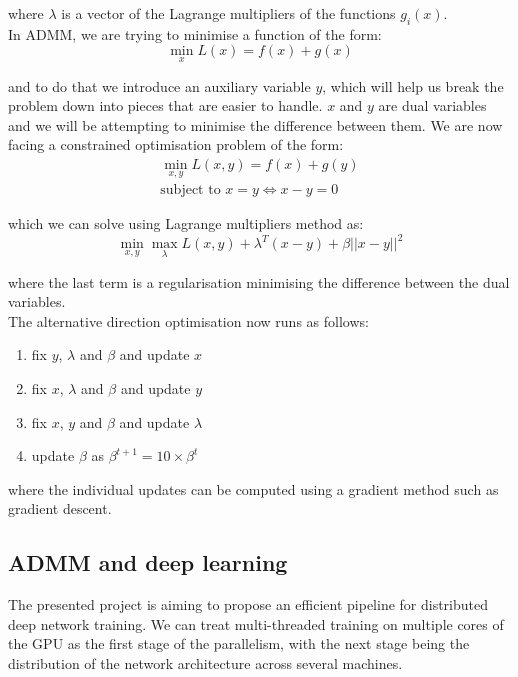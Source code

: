 \documentclass[a4paper, 12pt]{article}
\numberwithin{equation}{section}
\begin{document}
	where $\lambda$ is a vector of the Lagrange multipliers of the functions $g_i(x)$.\\

	In ADMM, we are trying to minimise a function of the form:
	\begin{equation}
	\min_{x} L(x) = f(x) + g(x)
	\end{equation}

	and to do that we introduce an auxiliary variable $y$, which will help us break the problem down into pieces that are easier to handle. $x$ and $y$ are dual variables and we will be attempting to minimise the difference between them. We are now facing a constrained optimisation problem of the form:
	\begin{align}
	\min_{x,y} L(x,y) = f(x) + g(y) \\
	\textrm{subject to } x = y \Leftrightarrow x-y=0
	\end{align}

	which we can solve using Lagrange multipliers method as:
	\begin{equation}
	\label{ADMM_equation}
	\min_{x,y} \max_{\lambda} L(x,y) + \lambda^T (x-y) + \beta ||x-y||^2
	\end{equation}

	where the last term is a regularisation minimising the difference between the dual variables. \\

	The alternative direction optimisation now runs as follows:
	\begin{enumerate}
		\item fix $y$, $\lambda$ and $\beta$ and update $x$
		\item fix $x$, $\lambda$ and $\beta$ and update $y$
		\item fix $x$, $y$ and $\beta$ and update $\lambda$
		\item update $\beta$ as $\beta^{t+1}=10 \times \beta^{t}$
	\end{enumerate}

	where the individual updates can be computed using a gradient method such as gradient descent.

	\subsection{ADMM and deep learning}

	The presented project is aiming to propose an efficient pipeline for distributed deep network training. We can treat multi-threaded training on multiple cores of the GPU as the first stage of the parallelism, with the next stage being the distribution of the network architecture across several machines.
\end{document}
